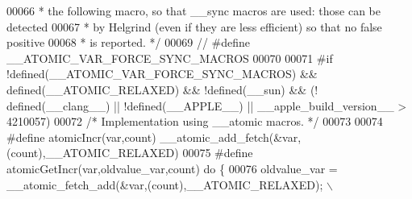 \begin{DoxyCode}
00066 \textcolor{comment}{ * the following macro, so that \_\_sync macros are used: those can be detected}
00067 \textcolor{comment}{ * by Helgrind (even if they are less efficient) so that no false positive}
00068 \textcolor{comment}{ * is reported. */}
00069 \textcolor{comment}{// #define \_\_ATOMIC\_VAR\_FORCE\_SYNC\_MACROS}
00070 
00071 \textcolor{preprocessor}{#}\textcolor{preprocessor}{if} \textcolor{preprocessor}{!}\textcolor{preprocessor}{defined}\textcolor{preprocessor}{(}\textcolor{preprocessor}{\_\_ATOMIC\_VAR\_FORCE\_SYNC\_MACROS}\textcolor{preprocessor}{)} \textcolor{preprocessor}{&&} \textcolor{preprocessor}{defined}\textcolor{preprocessor}{(}\_\_ATOMIC\_RELAXED\textcolor{preprocessor}{)} \textcolor{preprocessor}{&&} \textcolor{preprocessor}{!}\textcolor{preprocessor}{defined}\textcolor{preprocessor}{(}\textcolor{preprocessor}{\_\_sun}\textcolor{preprocessor}{)} \textcolor{preprocessor}{&&} \textcolor{preprocessor}{(}\textcolor{preprocessor}{!}\textcolor{preprocessor}{
      defined}\textcolor{preprocessor}{(}\_\_clang\_\_\textcolor{preprocessor}{)} \textcolor{preprocessor}{||} \textcolor{preprocessor}{!}\textcolor{preprocessor}{defined}\textcolor{preprocessor}{(}\textcolor{preprocessor}{\_\_APPLE\_\_}\textcolor{preprocessor}{)} \textcolor{preprocessor}{||} \textcolor{preprocessor}{\_\_apple\_build\_version\_\_} \textcolor{preprocessor}{>} 4210057\textcolor{preprocessor}{)}
00072 \textcolor{comment}{/* Implementation using \_\_atomic macros. */}
00073 
00074 \textcolor{preprocessor}{#}\textcolor{preprocessor}{define} \textcolor{preprocessor}{atomicIncr}\textcolor{preprocessor}{(}\textcolor{preprocessor}{var}\textcolor{preprocessor}{,}\textcolor{preprocessor}{count}\textcolor{preprocessor}{)} \textcolor{preprocessor}{\_\_atomic\_add\_fetch}\textcolor{preprocessor}{(}\textcolor{preprocessor}{&}\textcolor{preprocessor}{var}\textcolor{preprocessor}{,}\textcolor{preprocessor}{(}\textcolor{preprocessor}{count}\textcolor{preprocessor}{)}\textcolor{preprocessor}{,}\_\_ATOMIC\_RELAXED\textcolor{preprocessor}{)}
00075 \textcolor{preprocessor}{#}\textcolor{preprocessor}{define} \textcolor{preprocessor}{atomicGetIncr}\textcolor{preprocessor}{(}\textcolor{preprocessor}{var}\textcolor{preprocessor}{,}\textcolor{preprocessor}{oldvalue\_var}\textcolor{preprocessor}{,}\textcolor{preprocessor}{count}\textcolor{preprocessor}{)} \textcolor{keywordflow}{do} \textcolor{preprocessor}{\{}
00076     \textcolor{preprocessor}{oldvalue\_var} \textcolor{preprocessor}{=} \textcolor{preprocessor}{\_\_atomic\_fetch\_add}\textcolor{preprocessor}{(}\textcolor{preprocessor}{&}\textcolor{preprocessor}{var}\textcolor{preprocessor}{,}\textcolor{preprocessor}{(}\textcolor{preprocessor}{count}\textcolor{preprocessor}{)}\textcolor{preprocessor}{,}\_\_ATOMIC\_RELAXED\textcolor{preprocessor}{)}\textcolor{preprocessor}{;} \textcolor{preprocessor}{\(\backslash\)}

\end{DoxyCode}
